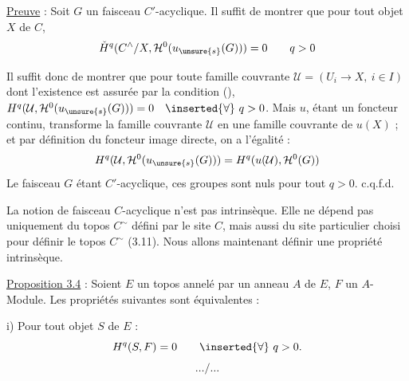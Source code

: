 
\uline{Preuve} : Soit $G$ un faisceau $C'$-acyclique. Il suffit de montrer que pour tout objet $X$ de $C$,
\[
\check H^q(C^{\wedge}/X,\mathcal H^0(u_{\unsure{s}}(G)))=0\qquad q>0
\]

Il suffit donc de montrer que pour toute famille couvrante
$\mathcal U=(U_i\longrightarrow X,\ i\in I)$ dont l'existence est assurée par la condition (),
$H^q(\mathcal U,\mathcal H^0(u_{\unsure{s}}(G)))=0\quad\inserted{\forall}\ q>0$.
Mais $u$, étant un foncteur continu, transforme la famille couvrante $\mathcal U$ en une famille couvrante de $u(X)$ ; et par définition du foncteur image directe, on a l'égalité :
\[
H^q(\mathcal U,\mathcal H^0(u_{\unsure{s}}(G)))=H^q(u(\mathcal U),\mathcal H^0(G))
\]
\margin{$\unsure{\forall\ \longrightarrow}$}
Le faisceau $G$ étant $C'$-acyclique, ces groupes sont nuls pour tout $q>0$. c.q.f.d.

La notion de faisceau $C$-acyclique n'est pas intrinsèque.
Elle ne dépend pas uniquement du topos $C^{\sim}$ défini par le site $C$, mais aussi du site particulier choisi pour définir le topos $C^{\sim}$ (3.11).
Nous allons maintenant définir une propriété intrinsèque.

\uline{Proposition 3.4} : Soient $E$ un topos annelé par un anneau $A$ de $E$, $F$ un $A$-Module. Les propriétés suivantes sont équivalentes :

i) Pour tout objet $S$ de $E$ :
\[
H^q(S,F)=0\qquad\inserted{\forall}\ q>0.
\]
\[\ldots/\ldots\]

